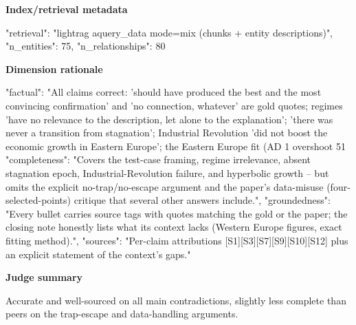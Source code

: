\documentclass[10pt]{article}
\begin{document}
\textbf{Index/retrieval metadata}
\begin{EvidenceText}
{
  "retrieval": "lightrag aquery_data mode=mix (chunks + entity descriptions)",
  "n_entities": 75,
  "n_relationships": 80
}
\end{EvidenceText}

\textbf{Dimension rationale}
\begin{EvidenceText}
{
  "factual": "All claims correct: 'should have produced the best and the most convincing confirmation' and 'no connection, whatever' are gold quotes; regimes 'have no relevance to the description, let alone to the explanation'; 'there was never a transition from stagnation'; Industrial Revolution 'did not boost the economic growth in Eastern Europe'; the Eastern Europe fit (AD 1 overshoot 51%
  "completeness": "Covers the test-case framing, regime irrelevance, absent stagnation epoch, Industrial-Revolution failure, and hyperbolic growth -- but omits the explicit no-trap/no-escape argument and the paper's data-misuse (four-selected-points) critique that several other answers include.",
  "groundedness": "Every bullet carries source tags with quotes matching the gold or the paper; the closing note honestly lists what its context lacks (Western Europe figures, exact fitting method).",
  "sources": "Per-claim attributions [S1][S3][S7][S9][S10][S12] plus an explicit statement of the context's gaps."
}
\end{EvidenceText}

\textbf{Judge summary}
\begin{EvidenceText}
Accurate and well-sourced on all main contradictions, slightly less complete than peers on the trap-escape and data-handling arguments.
\end{EvidenceText}
\end{document}
